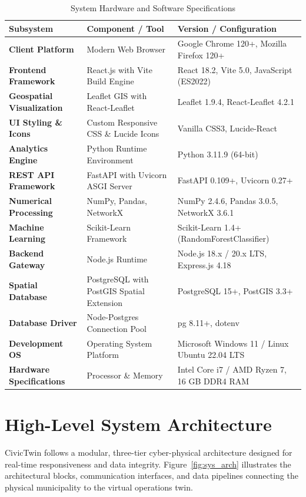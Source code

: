 \documentclass[12pt,a4paper]{report}
\begin{document}
\begin{table}[h!]
\centering
\caption{System Hardware and Software Specifications}
\label{tab:system_specs}
\fontsize{9pt}{11pt}\selectfont
\begin{tabular}{|p{3.5cm}|p{5.5cm}|p{4.5cm}|}
\hline
\textbf{Subsystem} & \textbf{Component / Tool} & \textbf{Version / Configuration} \\
\hline
\textbf{Client Platform} & Modern Web Browser & Google Chrome 120+, Mozilla Firefox 120+ \\
\textbf{Frontend Framework} & React.js with Vite Build Engine & React 18.2, Vite 5.0, JavaScript (ES2022) \\
\textbf{Geospatial Visualization} & Leaflet GIS with React-Leaflet & Leaflet 1.9.4, React-Leaflet 4.2.1 \\
\textbf{UI Styling \& Icons} & Custom Responsive CSS \& Lucide Icons & Vanilla CSS3, Lucide-React \\
\hline
\textbf{Analytics Engine} & Python Runtime Environment & Python 3.11.9 (64-bit) \\
\textbf{REST API Framework} & FastAPI with Uvicorn ASGI Server & FastAPI 0.109+, Uvicorn 0.27+ \\
\textbf{Numerical Processing} & NumPy, Pandas, NetworkX & NumPy 2.4.6, Pandas 3.0.5, NetworkX 3.6.1 \\
\textbf{Machine Learning} & Scikit-Learn Framework & Scikit-Learn 1.4+ (RandomForestClassifier) \\
\hline
\textbf{Backend Gateway} & Node.js Runtime & Node.js 18.x / 20.x LTS, Express.js 4.18 \\
\textbf{Spatial Database} & PostgreSQL with PostGIS Spatial Extension & PostgreSQL 15+, PostGIS 3.3+ \\
\textbf{Database Driver} & Node-Postgres Connection Pool & pg 8.11+, dotenv \\
\hline
\textbf{Development OS} & Operating System Platform & Microsoft Windows 11 / Linux Ubuntu 22.04 LTS \\
\textbf{Hardware Specifications} & Processor \& Memory & Intel Core i7 / AMD Ryzen 7, 16 GB DDR4 RAM \\
\hline
\end{tabular}
\end{table}

\section{High-Level System Architecture}
CivicTwin follows a modular, three-tier cyber-physical architecture designed for real-time responsiveness and data integrity. Figure~\ref{fig:sys_arch} illustrates the architectural blocks, communication interfaces, and data pipelines connecting the physical municipality to the virtual operations twin.
\end{document}
